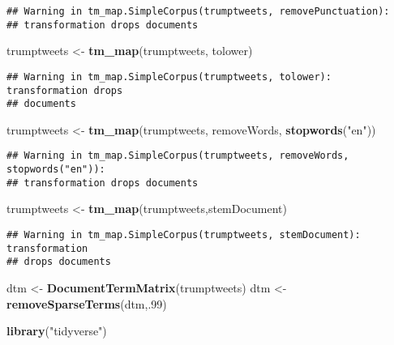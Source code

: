 \documentclass[]{article}
\newenvironment{Shaded}{\begin{snugshade}}{\end{snugshade}}
\newcommand{\KeywordTok}[1]{\textcolor[rgb]{0.13,0.29,0.53}{\textbf{#1}}}
\newcommand{\DecValTok}[1]{\textcolor[rgb]{0.00,0.00,0.81}{#1}}
\newcommand{\StringTok}[1]{\textcolor[rgb]{0.31,0.60,0.02}{#1}}
\newcommand{\NormalTok}[1]{#1}
\begin{document}
\begin{verbatim}
## Warning in tm_map.SimpleCorpus(trumptweets, removePunctuation):
## transformation drops documents
\end{verbatim}

\begin{Shaded}
\begin{Highlighting}[]
\NormalTok{trumptweets <-}\StringTok{ }\KeywordTok{tm_map}\NormalTok{(trumptweets, tolower)}
\end{Highlighting}
\end{Shaded}

\begin{verbatim}
## Warning in tm_map.SimpleCorpus(trumptweets, tolower): transformation drops
## documents
\end{verbatim}

\begin{Shaded}
\begin{Highlighting}[]
\NormalTok{trumptweets <-}\StringTok{ }\KeywordTok{tm_map}\NormalTok{(trumptweets, removeWords, }\KeywordTok{stopwords}\NormalTok{(}\StringTok{"en"}\NormalTok{))}
\end{Highlighting}
\end{Shaded}

\begin{verbatim}
## Warning in tm_map.SimpleCorpus(trumptweets, removeWords, stopwords("en")):
## transformation drops documents
\end{verbatim}

\begin{Shaded}
\begin{Highlighting}[]
\NormalTok{trumptweets <-}\StringTok{ }\KeywordTok{tm_map}\NormalTok{(trumptweets,stemDocument)}
\end{Highlighting}
\end{Shaded}

\begin{verbatim}
## Warning in tm_map.SimpleCorpus(trumptweets, stemDocument): transformation
## drops documents
\end{verbatim}

\begin{Shaded}
\begin{Highlighting}[]
\NormalTok{dtm <-}\StringTok{ }\KeywordTok{DocumentTermMatrix}\NormalTok{(trumptweets)}
\NormalTok{dtm <-}\StringTok{ }\KeywordTok{removeSparseTerms}\NormalTok{(dtm,.}\DecValTok{99}\NormalTok{)}

\KeywordTok{library}\NormalTok{(}\StringTok{"tidyverse"}\NormalTok{)}
\end{Highlighting}
\end{Shaded}
\end{document}
